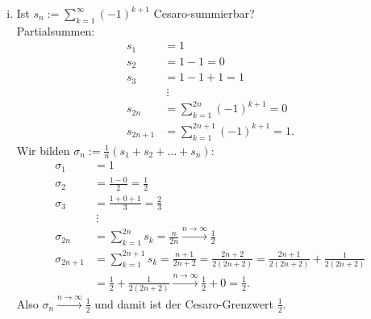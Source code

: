 \documentclass[12pt,a4paper]{article}
\begin{document}
\begin{enumerate}[(i)]
    \item \pagebreak Ist $s_n := \sum\limits_{k=1}^\infty (-1)^{k+1}$ Cesaro-summierbar?\\
    Partialsummen:
    \begin{align*}
        s_1 &= 1\\
        s_2 &= 1-1 = 0\\
        s_3 &= 1-1+1 = 1\\
        &\ \vdots\\
        s_{2n} &= \sum\limits_{k=1}^{2n} (-1)^{k+1} = 0\\
        s_{2n+1} &= \sum\limits_{k=1}^{2n+1} (-1)^{k+1} = 1.
    \end{align*}
    Wir bilden $\sigma_n := \frac{1}{n} (s_1 + s_2 + \ldots + s_n)$:
    \begin{align*}
        \sigma_1 &= 1\\
        \sigma_2 &= \frac{1-0}{2} = \frac{1}{2}\\
        \sigma_3 &= \frac{1+0+1}{3} = \frac{2}{3}\\
        &\ \vdots\\
        \sigma_{2n} &= \sum\limits_{k=1}^{2n} s_k = \frac{n}{2n} \overset{n \to \infty}{\longrightarrow} \frac{1}{2}\\
        \sigma_{2n+1} &= \sum\limits_{k=1}^{2n+1} s_k
        = \frac{n+1}{2n+2}
        = \frac{2n+2}{2(2n+2)}
        = \frac{2n+1}{2(2n+2)} + \frac{1}{2(2n+2)}\\
        &= \frac{1}{2} + \frac{1}{2(2n+2)}
        \overset{n \to \infty}{\longrightarrow} \frac{1}{2} + 0
        = \frac{1}{2}.
    \end{align*}
    Also $\sigma_n \overset{n \to \infty}{\longrightarrow} \frac{1}{2}$ und damit ist der Cesaro-Grenzwert $\frac{1}{2}$.
\end{enumerate}


\end{document}
